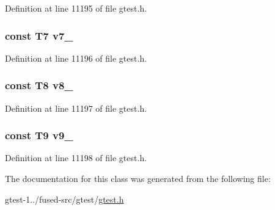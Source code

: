 \-Definition at line 11195 of file gtest.\-h.

\hypertarget{classtesting_1_1internal_1_1ValueArray19_a4063f0b7a528133d018ee488ba44a9a3}{
\subsubsection[{v7\-\_\-}]{\setlength{\rightskip}{0pt plus 5cm}const \-T7 {\bf v7\-\_\-}}}\label{de/dc6/classtesting_1_1internal_1_1ValueArray19_a4063f0b7a528133d018ee488ba44a9a3}


\-Definition at line 11196 of file gtest.\-h.

\hypertarget{classtesting_1_1internal_1_1ValueArray19_a596bc5260b2474271d1f6910ff6f665d}{
\subsubsection[{v8\-\_\-}]{\setlength{\rightskip}{0pt plus 5cm}const \-T8 {\bf v8\-\_\-}}}\label{de/dc6/classtesting_1_1internal_1_1ValueArray19_a596bc5260b2474271d1f6910ff6f665d}


\-Definition at line 11197 of file gtest.\-h.

\hypertarget{classtesting_1_1internal_1_1ValueArray19_a6356e16cf54a9dfac8525f20242af31e}{
\subsubsection[{v9\-\_\-}]{\setlength{\rightskip}{0pt plus 5cm}const \-T9 {\bf v9\-\_\-}}}\label{de/dc6/classtesting_1_1internal_1_1ValueArray19_a6356e16cf54a9dfac8525f20242af31e}


\-Definition at line 11198 of file gtest.\-h.



\-The documentation for this class was generated from the following file\-:\begin{DoxyCompactItemize}
\item 
gtest-\/1../fused-\/src/gtest/\hyperlink{fused-src_2gtest_2gtest_8h}{gtest.\-h}\end{DoxyCompactItemize}
